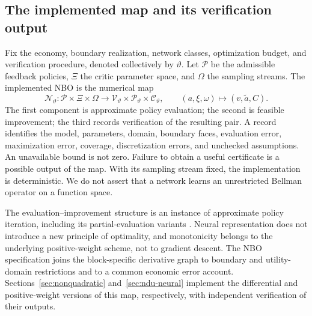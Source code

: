 \subsection{The implemented map and its verification output}\label{sec:implemented}
Fix the economy, boundary realization, network classes, optimization budget, and verification procedure, denoted collectively by $\vartheta$. Let $\mathcal P$ be the admissible feedback policies, $\Xi$ the critic parameter space, and $\Omega$ the sampling streams. The implemented NBO is the numerical map
\begin{equation}\label{eq:implemented-r6}
 \mathcal N_\vartheta:\mathcal P\times\Xi\times\Omega
 \longrightarrow\mathcal V_\vartheta\times\mathcal P_\vartheta\times\mathcal C_\vartheta,
 \qquad(a,\xi,\omega)\longmapsto(v,\widetilde a,C).
\end{equation}
The first component is approximate policy evaluation; the second is feasible improvement; the third records verification of the resulting pair. A record identifies the model, parameters, domain, boundary faces, evaluation error, maximization error, coverage, discretization errors, and unchecked assumptions. An unavailable bound is not zero. Failure to obtain a useful certificate is a possible output of the map. With its sampling stream fixed, the implementation is deterministic. We do not assert that a network learns an unrestricted Bellman operator on a function space.

The evaluation--improvement structure is an instance of approximate policy iteration, including its partial-evaluation variants \citep{scherrer2015}. Neural representation does not introduce a new principle of optimality, and monotonicity belongs to the underlying positive-weight scheme, not to gradient descent. The NBO specification joins the block-specific derivative graph to boundary and utility-domain restrictions and to a common economic error account. Sections~\ref{sec:nonquadratic} and~\ref{sec:ndu-neural} implement the differential and positive-weight versions of this map, respectively, with independent verification of their outputs.

